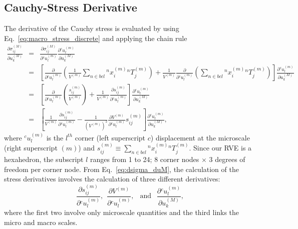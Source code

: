 \documentclass[12pt,aps,pre]{revtex4}
\begin{document}
\subsection{Cauchy-Stress Derivative}
%
The derivative of the Cauchy stress is evaluated by using Eq.\ \eqref{eq:macro_stress_discrete} and applying the chain rule
%
\begin{eqnarray}
\frac{\partial \sigma_{ij}^{(M)}}{\partial  u^{(M)}_k}  &=& \frac{\partial \sigma_{ij}^{(M)}}{\partial {}^c u_l^{(m)}} \frac{\partial {}^c u_l^{(m)}}{\partial u^{(M)}_k} \nonumber\\
%
&=& \left [ \frac{\partial}{\partial {}^c u^{(m)}_l}  \left(\frac{1}{V^{(m)}} \sum_{n \in bcl} {}^nx_i^{(m)} {}^nT_j^{(m)}\right)+ \frac{1}{V^{(m)}} \frac{\partial}{\partial {}^c u^{(m)}_l} \left(\sum_{n \in bcl} {}^nx_i^{(m)} {}^nT_j^{(m)} \right) \right] \frac{\partial {}^c u_l^{{(m)}}}{\partial u^{(M)}_k} \nonumber\\
%
&=&  \left[\frac{\partial}{\partial {}^c u^{(m)}_l}  \left(\frac{s_{ij}^{(m)}}{V^{(m)}} \right) + \frac{1}{V^{(m)}} \frac{\partial s_{ij}^{(m)}}{\partial {}^c u^{(m)}_l}\right] \frac{\partial {}^c u_l^{{(m)}}}{\partial u^{(M)}_k} \nonumber\\
%
&=& \left[\frac{1}{V^{(m)}} \frac{\partial s_{ij}^{(m)}}{\partial {}^c u^{(m)}_l} -\frac{1}{(V^{(m)})^2}\frac{\partial V^{(m)}}{\partial {}^c u^{(m)}_l}s_{ij}^{(m)} \right] \frac{\partial {}^c u_l^{{(m)}}}{\partial u^{(M)}_k},
\label{eq:dsigma_duM}
\end{eqnarray}
%
where ${}^c u_l^{{(m)}}$ is the $l^{th}$ corner (left superscript $c$) displacement at the microscale (right superscript $(m)$) and $s_{ij}^{(m)} \equiv \sum_{n \in bcl} {}^n x^{(m)}_i {}^nT^{(m)}_j$. Since our RVE is a hexahedron, the subscript $l$ ranges from 1 to 24; 8 corner nodes $\times$ 3 degrees of freedom per corner node.  From Eq.\ \eqref{eq:dsigma_duM}, the calculation of the stress derivatives involves the calculation of three different derivatives:
%
\begin{equation}
\frac{\partial s_{ij}^{(m)}}{\partial {}^cu_l^{{(m)}} }, \ \
\frac{\partial V^{(m)}}{\partial {}^c u_l^{{(m)}}}, \ \ \text{ and } \ \ 
\frac{\partial {}^c u_l^{{(m)}}}{\partial u^{(M)}_k},
\end{equation}
%
where the first two involve only microscale quantities and the third links the micro and macro scales.
\end{document}
